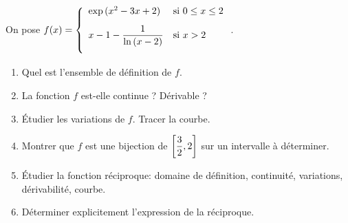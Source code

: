 \documentclass[a4paper, 11pt,reqno]{article}
\begin{document}
\begin{exercice}  \;
	On pose $f(x)=\left\lbrace \begin{array}{ll} \exp{(x^2-3x+2)} &\hbox{si}\ 0\leq x\leq 2\vsec\\ x-1-\ddp\frac{1}{\ln{(x-2)}} &\hbox{si}\ x>2\vsec \end{array}\right.$.
	\begin{enumerate}
		\item Quel est l'ensemble de d\'efinition de $f$.
		\item La fonction $f$ est-elle continue ? D\'erivable ?
		\item \'Etudier les variations de $f$. Tracer la courbe.
		\item Montrer que $f$ est une bijection de $\left\lbrack \displaystyle\frac{3}{2},2\right\rbrack$ sur un intervalle \`{a} d\'eterminer.
		\item \'Etudier la fonction r\'eciproque: domaine de d\'efinition, continuit\'e, variations, d\'erivabilit\'e, courbe.
		\item D\'eterminer explicitement l'expression de la r\'eciproque.
	\end{enumerate}
\end{exercice}
\end{document}
